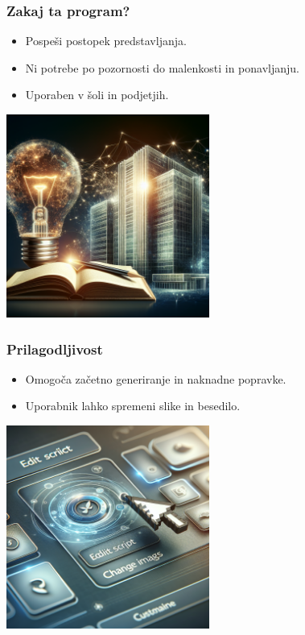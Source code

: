 \documentclass{beamer}
\begin{document}
\begin{frame}
\frametitle{Zakaj ta program?}
\begin{itemize}
    \item Pospeši postopek predstavljanja.
    \item Ni potrebe po pozornosti do malenkosti in ponavljanju.
    \item Uporaben v šoli in podjetjih.
\end{itemize}
\centering
\includegraphics[width=0.5\textwidth]{./images/reasons.png}
\end{frame}

\begin{frame}
\frametitle{Prilagodljivost}
\begin{itemize}
    \item Omogoča začetno generiranje in naknadne popravke.
    \item Uporabnik lahko spremeni slike in besedilo.
\end{itemize}
\centering
\includegraphics[width=0.5\textwidth]{./images/customize.png}
\end{frame}
\end{document}
